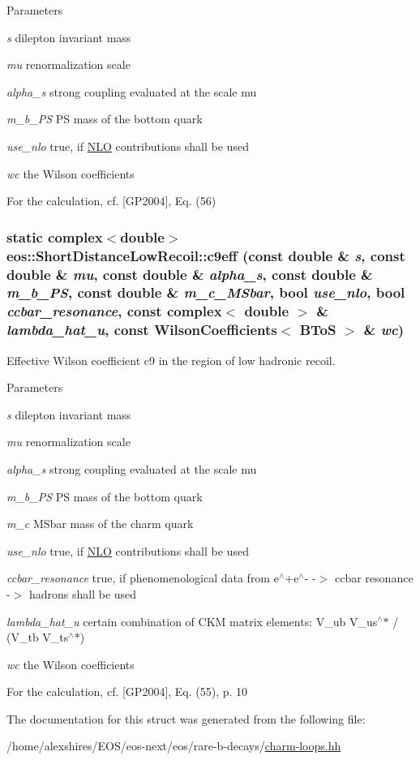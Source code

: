 \begin{DoxyParams}{Parameters}
\item[{\em s}]dilepton invariant mass \item[{\em mu}]renormalization scale \item[{\em alpha\_\-s}]strong coupling evaluated at the scale mu \item[{\em m\_\-b\_\-PS}]PS mass of the bottom quark \item[{\em use\_\-nlo}]true, if \hyperlink{structeos_1_1NLO}{NLO} contributions shall be used \item[{\em wc}]the Wilson coefficients\end{DoxyParams}
For the calculation, cf. \mbox{[}GP2004\mbox{]}, Eq. (56) \hypertarget{structeos_1_1ShortDistanceLowRecoil_aaaee347f2e54c1edad33b9806c437cdd}{
\subsubsection[{c9eff}]{\setlength{\rightskip}{0pt plus 5cm}static complex$<$double$>$ eos::ShortDistanceLowRecoil::c9eff (const double \& {\em s}, \/  const double \& {\em mu}, \/  const double \& {\em alpha\_\-s}, \/  const double \& {\em m\_\-b\_\-PS}, \/  const double \& {\em m\_\-c\_\-MSbar}, \/  bool {\em use\_\-nlo}, \/  bool {\em ccbar\_\-resonance}, \/  const complex$<$ double $>$ \& {\em lambda\_\-hat\_\-u}, \/  const WilsonCoefficients$<$ {\bf BToS} $>$ \& {\em wc})}}
\label{structeos_1_1ShortDistanceLowRecoil_aaaee347f2e54c1edad33b9806c437cdd}
Effective Wilson coefficient c9 in the region of low hadronic recoil.


\begin{DoxyParams}{Parameters}
\item[{\em s}]dilepton invariant mass \item[{\em mu}]renormalization scale \item[{\em alpha\_\-s}]strong coupling evaluated at the scale mu \item[{\em m\_\-b\_\-PS}]PS mass of the bottom quark \item[{\em m\_\-c}]MSbar mass of the charm quark \item[{\em use\_\-nlo}]true, if \hyperlink{structeos_1_1NLO}{NLO} contributions shall be used \item[{\em ccbar\_\-resonance}]true, if phenomenological data from e$^\wedge$+e$^\wedge$-\/ -\/$>$ ccbar resonance -\/$>$ hadrons shall be used \item[{\em lambda\_\-hat\_\-u}]certain combination of CKM matrix elements: V\_\-ub V\_\-us$^\wedge$$\ast$ / (V\_\-tb V\_\-ts$^\wedge$$\ast$) \item[{\em wc}]the Wilson coefficients\end{DoxyParams}
For the calculation, cf. \mbox{[}GP2004\mbox{]}, Eq. (55), p. 10 

The documentation for this struct was generated from the following file:\begin{DoxyCompactItemize}
\item 
/home/alexshires/EOS/eos-\/next/eos/rare-\/b-\/decays/\hyperlink{charm-loops_8hh}{charm-\/loops.hh}\end{DoxyCompactItemize}
